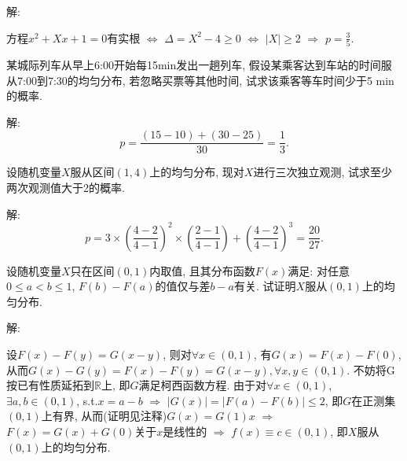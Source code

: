 \documentclass[standard]{ExBook}
\renewenvironment{shaded}{%
  \def\FrameCommand{\fboxsep=\FrameSep \colorbox{shadecolor}}%
  \MakeFramed{\advance\hsize-\width \FrameRestore}%
}{%
  \endMakeFramed
}
\begin{document}
\begin{qitems}
\vspace{\dimexpr2.5cm-5em\relax}

解: 

方程$x^2+Xx+1=0$有实根 $\Longleftrightarrow$ $\Delta=X^2-4\geq0$ $\Longleftrightarrow$ $|X|\geq 2$ $\Longrightarrow$ $p=\displaystyle\frac{3}{5}$.

\vspace{2.5cm-5em}

    \begin{bbox}
    \begin{shaded}
        \qitem
某城际列车从早上6:00开始每15min发出一趟列车, 假设某乘客达到车站的时间服从7:00到7:30的均匀分布, 若忽略买票等其他时间, 试求该乘客等车时间少于5 min的概率.
    \end{shaded}
    \end{bbox}

\vspace{\dimexpr2.5cm-5em\relax}

解: 
$$p=\displaystyle\frac{(15-10)+(30-25)}{30}=\frac{1}{3}.$$

\vspace{2.5cm-5em}

    \begin{bbox}
    \begin{shaded}
        \qitem
设随机变量$X$服从区间$(1,4)$上的均匀分布, 现对$X$进行三次独立观测, 试求至少两次观测值大于2的概率.
    \end{shaded}
    \end{bbox}

\vspace{\dimexpr2.5cm-5em\relax}

解: 
$$p=\displaystyle3\times\left(\frac{4-2}{4-1}\right)^{2}\times\left(\frac{2-1}{4-1}\right)+\left(\frac{4-2}{4-1}\right)^{3}=\frac{20}{27}.$$

\vspace{2.5cm-5em}

    \begin{bbox}
    \begin{shaded}
        \qitem
设随机变量$X$只在区间$(0,1)$内取值, 且其分布函数$F(x)$满足: 对任意$0 \leq a < b \leq 1$, $F(b) - F(a)$的值仅与差$b-a$有关. 试证明$X$服从$(0,1)$上的均匀分布.
    \end{shaded}
    \end{bbox}

\vspace{\dimexpr2.5cm-5em\relax}

解: 

设$F(x)-F(y)=G(x-y)$, 则对$\forall x\in(0,1)$, 有$G(x)=F(x)-F(0)$, 从而$G(x)-G(y)=F(x)-F(y)=G(x-y),\forall x,y\in(0,1)$. 不妨将G按已有性质延拓到$\mathbb{R}$上, 即$G$满足柯西函数方程. 由于对$\forall x\in(0,1)$, $\exists a,b\in(0,1)$, s.t.$x=a-b$ $\Longrightarrow$ $|G(x)|=|F(a)-F(b)| \leq 2$, 即$G$在正测集$(0,1)$上有界, 从而(证明见注释)$G(x)=G(1)x$ $\Longrightarrow$ $F(x)=G(x)+G(0)$关于$x$是线性的 $\Longrightarrow$ $f(x)\equiv c\in(0,1)$, 即$X$服从$(0,1)$上的均匀分布.


\end{qitems}
\end{document}
